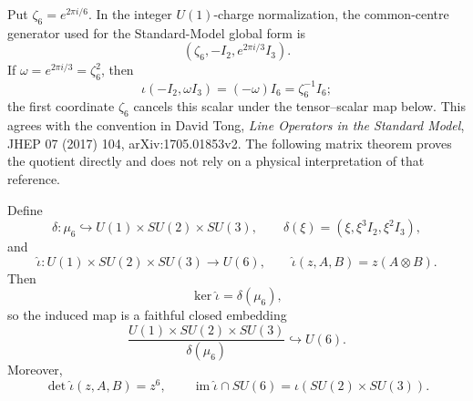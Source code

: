 Put $\zeta_6=e^{2\pi i/6}$.  In the integer $U(1)$-charge
normalization, the common-centre generator used for the Standard-Model
global form is
\[
 (\zeta_6,-I_2,e^{2\pi i/3}I_3).
\]
If $\omega=e^{2\pi i/3}=\zeta_6^2$, then
\[
 \iota(-I_2,\omega I_3)=(-\omega)I_6=\zeta_6^{-1}I_6;
\]
the first coordinate $\zeta_6$ cancels this scalar under the
tensor--scalar map below.
This agrees with the convention in David Tong, \emph{Line Operators in the
Standard Model}, JHEP 07 (2017) 104, arXiv:1705.01853v2.  The following
matrix theorem proves the quotient directly and does not rely on a physical
interpretation of that reference.

\begin{theorem}
\label{zdc:thm:common-centre}
Define
\begin{equation}
 \delta:\mu_6\hookrightarrow U(1)\times SU(2)\times SU(3),
 \qquad
 \delta(\xi)=(\xi,\xi^3I_2,\xi^2I_3),
 \label{zdc:eq:delta}
\end{equation}
and
\begin{equation}
 \widehat\iota:U(1)\times SU(2)\times SU(3)\longrightarrow U(6),
 \qquad
 \widehat\iota(z,A,B)=z(A\otimes B).
 \label{zdc:eq:extended-map}
\end{equation}
Then
\begin{equation}
 \ker\widehat\iota=\delta(\mu_6),
 \label{zdc:eq:extended-kernel}
\end{equation}
so the induced map is a faithful closed embedding
\begin{equation}
 \frac{U(1)\times SU(2)\times SU(3)}{\delta(\mu_6)}
 \hookrightarrow U(6).
 \label{zdc:eq:g6-embedding}
\end{equation}
Moreover,
\begin{equation}
 \boxed{\det\widehat\iota(z,A,B)=z^6,}
 \qquad
 \boxed{\operatorname{im}\widehat\iota\cap SU(6)
        =\iota(SU(2)\times SU(3)).}
 \label{zdc:eq:det-intersection}
\end{equation}
\end{theorem}

